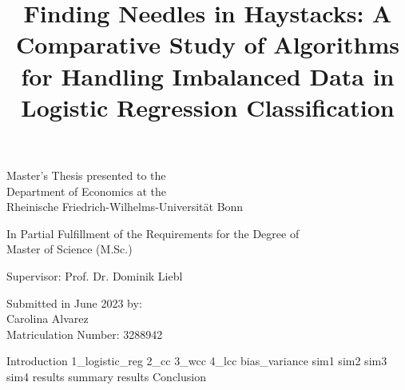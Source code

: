 \documentclass[12pt, a4paper]{article} %
\theoremstyle{MAstyle} \newtheorem{assumption}{Assumption}[section]
\theoremstyle{MAstyle} \newtheorem{definition}{Definition}[section]
\theoremstyle{MAstyle} \newtheorem{theorem}{Theorem}[section]
\theoremstyle{MAstyle} \newtheorem{lemma}{Lemma}[]
\begin{document}
	
	\title{{Finding Needles in Haystacks: A 
        Comparative Study of Algorithms for Handling Imbalanced Data in Logistic Regression Classification}}
	\date{}
	\maketitle
	\thispagestyle{empty}
	\vspace{1.5 cm}
	\begin{center}
		
		\Large
		Master's Thesis presented to the\\
		Department of Economics at the\\
		Rheinische Friedrich-Wilhelms-Universität Bonn
		\vspace{1.5cm}

		\large
		In Partial Fulfillment of the Requirements 
            for the Degree of\\
		Master of Science (M.Sc.)
		
		\vspace{2cm}
		
		Supervisor: Prof. Dr. Dominik Liebl
		
		\vspace{3cm}
		
		Submitted in June 2023 by: \\
		Carolina Alvarez \\
		Matriculation Number: 3288942
	\end{center}
	
	\newpage
	
	\thispagestyle{empty}
	\tableofcontents
	\listoffigures
    \listoftables
	\thispagestyle{empty}
	
	\newpage
	
	\renewcommand{\labelenumii}{\arabic{enumi}.\arabic{enumii}}
    \renewcommand{\labelenumiii}{\arabic{enumi}.\arabic{enumii}.\arabic{enumiii}}
    \renewcommand{\labelenumiv}{\arabic{enumi}.\arabic{enumii}.\arabic{enumiii}.\arabic{enumiv}}
	
    {Introduction}
    {1_logistic_reg}
    {2_cc}
    {3_wcc}
    {4_lcc}
    {bias_variance}
    {sim1}
    {sim2}
    {sim3}
    {sim4}
    {results}
    {summary}
    {results}
    {Conclusion}
    
\end{document}
